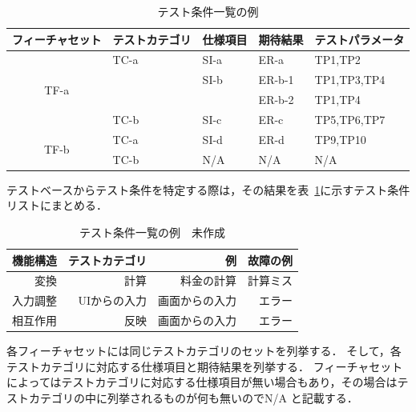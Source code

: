 \begin{table}[htbp]
  \centering
  \caption{テスト条件一覧の例}
    \begin{tabular}{|c|p{6em}|p{6em}|p{6em}|p{7.145em}|}
    \hline
    \multicolumn{1}{|p{8.855em}|}{\textbf{フィーチャセット}} & \textbf{テストカテゴリ} & \textbf{仕様項目} & \textbf{期待結果} & \textbf{テストパラメータ} \bigstrut \\
    \hline
    \multicolumn{1}{|c|}{\multirow{4}[8]{*}{TF-a}} & TC-a  & SI-a  & ER-a  & TP1,TP2 \bigstrut\\
\cline{2-5}          & \multicolumn{1}{l|}{} & SI-b  & ER-b-1 & TP1,TP3,TP4 \bigstrut\\
\cline{2-5}          & \multicolumn{1}{l|}{} & \multicolumn{1}{l|}{} & ER-b-2 & TP1,TP4 \bigstrut\\
\cline{2-5}          & TC-b  & SI-c  & ER-c  & TP5,TP6,TP7 \bigstrut\\
    \hline
    \multicolumn{1}{|c|}{\multirow{2}[4]{*}{TF-b}} & TC-a  & SI-d  & ER-d  & TP9,TP10 \bigstrut\\
\cline{2-5}          & TC-b  & N/A   & N/A   & N/A \bigstrut\\
    \hline
    \end{tabular}%
  \label{tbl:D-3-tbl3}%
\end{table}%

テストベースからテスト条件を特定する際は，その結果を表~\ref{tbl:D-3-tbl3}に示すテスト条件リストにまとめる．

\begin{table}[t]
\caption{テスト条件一覧の例　未作成}
\label{tbl:D-3-tbl2}
\begin{center}
\begin{tabular}{r|r|r|r}
機能構造&テストカテゴリ&例&故障の例\\
\hline
\hline
変換&計算&料金の計算&計算ミス\\
\hline
入力調整&UIからの入力&画面からの入力&エラー\\
\hline
相互作用&反映&画面からの入力&エラー\\
    \hline
\end{tabular}%
\end{center}
\end{table}



各フィーチャセットには同じテストカテゴリのセットを列挙する．
そして，各テストカテゴリに対応する仕様項目と期待結果を列挙する．
フィーチャセットによってはテストカテゴリに対応する仕様項目が無い場合もあり，その場合はテストカテゴリの中に列挙されるものが何も無いのでN/A と記載する．




